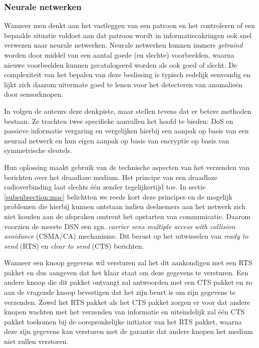 \subsubsection*{Neurale netwerken}
\label{subsubsection:neuralnetworks}

Wanneer men denkt aan het vastleggen van een patroon en het controleren of een
bepaalde situatie voldoet aan dat patroon wordt in informatiecakringen ook snel
verwezen naar neurale netwerken. Neurale netwerken kunnen immers
\emph{getraind} worden door middel van een aantal goede (en slechte)
voorbeelden, waarna nieuwe voorbeelden kunnen gecatalogeerd worden als ook goed
of slecht. De complexiteit van het bepalen van deze beslissing is typisch
redelijk eenvoudig en lijkt zich daarom uitermate goed te lenen voor het
detecteren van anomalie\"en door sensorknopen.

In \citep{ramesh2012wireless} volgen de auteurs deze denkpiste, maar stellen
tevens dat er betere methoden bestaan. Ze trachten twee specifieke aanvallen
het hoofd te bieden: DoS en passieve informatie vergaring en vergelijken
hierbij een aanpak op basis van een neuraal netwerk en hun eigen aanpak op
basis van encryptie op basis van symmetrische sleutels.

Hun oplossing maakt gebruik van de technische aspecten van het verzenden van
berichten over het draadloze medium. Het principe van een draadloze
radioverbinding laat slechts \'e\'en zender tegelijkertijd toe. In sectie
\ref{subsubsection:mac} belichtten we reeds kort deze principes en de mogelijk
problemen die hierbij kunnen ontstaan indien deelnemers aan het netwerk zich
niet houden aan de afspraken omtrent het opstarten van communicatie. Daarom
voorzien de meeste DSN een zgn. \emph{carrier sens multiple access with
collision avoidance} (CSMA/CA) mechanisme. Dit berust op het uitwisselen van
\emph{ready to send} (RTS) en \emph{clear to send} (CTS) berichten.

Wanneer een knoop gegevens wil versturen zal het dit aankondigen met een RTS
pakket en dus aangeven dat het klaar staat om deze gegevens te versturen. Een
andere knoop die dit pakket ontvangt zal antwoorden met een CTS pakket en zo
aan de vragende knoop bevestigen dat het zijn beurt is om zijn gegevens te
verzenden. Zowel het RTS pakket als het CTS pakket zorgen er voor dat andere
knopen wachten met het verzenden van informatie en uiteindelijk zal \'e\'en CTS
pakket toekomen bij de oorspronkelijke initiator van het RTS pakket, waarna
deze zijn gegevens kan versturen met de garantie dat andere knopen het medium
niet zullen verstoren.

